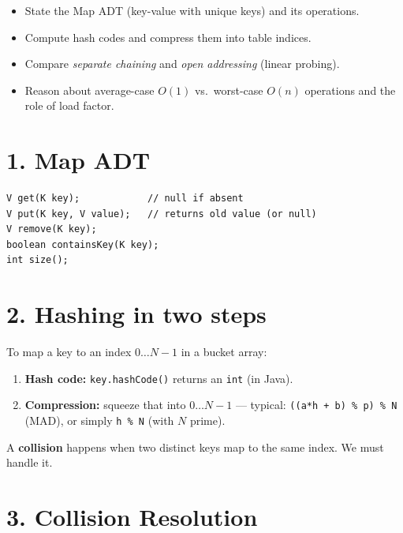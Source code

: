 \documentclass[11pt]{article}
\begin{document}

\begin{objbox}
\begin{itemize}[leftmargin=*]
  \item State the Map ADT (key-value with unique keys) and its operations.
  \item Compute hash codes and compress them into table indices.
  \item Compare \emph{separate chaining} and \emph{open addressing} (linear probing).
  \item Reason about average-case $O(1)$ vs.\ worst-case $O(n)$ operations and the role of load factor.
\end{itemize}
\end{objbox}

\section*{1. Map ADT}

\begin{lstlisting}
V get(K key);            // null if absent
V put(K key, V value);   // returns old value (or null)
V remove(K key);
boolean containsKey(K key);
int size();
\end{lstlisting}

\section*{2. Hashing in two steps}

To map a key to an index $0\ldots N-1$ in a bucket array:
\begin{enumerate}[leftmargin=*]
  \item \textbf{Hash code:} \texttt{key.hashCode()} returns an \texttt{int} (in Java).
  \item \textbf{Compression:} squeeze that into $0\ldots N-1$ --- typical: \verb|((a*h + b) % p) % N| (MAD), or simply \verb|h % N| (with $N$ prime).
\end{enumerate}

A \textbf{collision} happens when two distinct keys map to the same index. We must handle it.

\section*{3. Collision Resolution}
\end{document}
